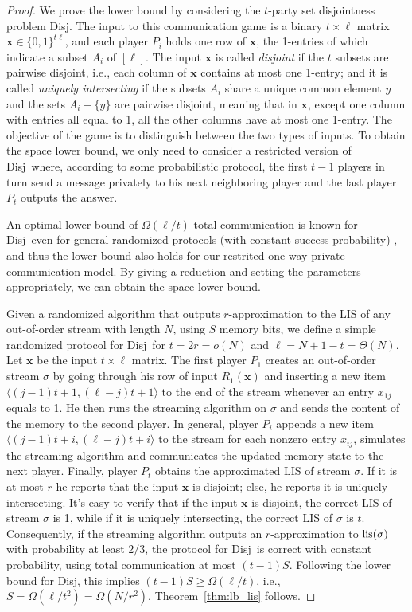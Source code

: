 \documentclass{llncs}
\newcommand{\disj}{{\sc Disj}}
\newcommand{\bx}{\mathbf{x}}
\newcommand{\lis}{{\rm lis}}
\begin{document}
\begin{proof}
We prove the lower bound by considering the $t$-party set disjointness
problem \disj.  The input to this communication game is a binary $t \times \ell$
matrix $\bx \in \{0, 1\}^{t\ell}$, and each player $P_i$ holds one row of
$\bx$, the 1-entries of which indicate a subset $A_i$ of $[\ell]$.  The input
$\bx$ is called \emph{disjoint} if the $t$ subsets are pairwise
disjoint, i.e., each column of $\bx$ contains at most one 1-entry; and it is
called \emph{uniquely intersecting} if the subsets $A_i$ share a unique common
element $y$ and the sets $A_i - \{y\}$ are pairwise disjoint, meaning that in
$\bx$, except one column with entries all equal to 1, all the other columns have at most one
1-entry.  The objective of the game is to distinguish between the two types of
inputs.  To obtain the space lower bound, we only need to consider a restricted 
version of \disj~where, according to some probabilistic protocol, the first
$t-1$ players in turn send a message privately to his next neighboring player and the last
player $P_t$ outputs the answer.

An optimal lower bound of $\Omega(\ell/t)$ total communication is known for
\disj~even for general randomized protocols (with constant success probability) 
\cite{Jay09}, and thus the lower
bound also holds for our restrited one-way private communication model.  By
giving a reduction and setting the parameters appropriately, we can obtain the
space lower bound.

Given a randomized algorithm that outputs $r$-approximation to the LIS of any out-of-order stream
with length $N$, using $S$ memory bits, we
define a simple randomized protocol for \disj~for $t = 2r = o(N)$ and $\ell =
N+1-t = \Theta(N)$.  Let $\bx$ be the input $t\times \ell$ matrix.  The first player
$P_1$ creates an out-of-order stream $\sigma$ by going through his row of input
$R_1(\bx)$ and inserting a new item $\langle (j-1)t+1, (\ell-j)t+1 \rangle$ to
the end of the stream
whenever an entry $x_{1j}$ equals to 1.  He then runs the streaming algorithm on
$\sigma$ and sends the content of the memory to the second player.  In general,
player $P_i$ appends a new item $\langle (j-1)t+i, (\ell-j)t+i \rangle$ to the
stream for each nonzero entry $x_{ij}$, simulates the streaming algorithm and
communicates the updated memory state to the next player.  Finally, player $P_t$ obtains
the approximated LIS of stream $\sigma$.  If it is at most $r$ he reports
that the input $\bx$ is disjoint; else, he reports it is uniquely intersecting.
It's easy to verify that if the input $\bx$ is disjoint, the correct LIS of stream $\sigma$ is 1,
while if it is uniquely intersecting, the correct LIS of $\sigma$ is $t$.
Consequently, if the streaming algorithm outputs an $r$-approximation to
$\lis(\sigma)$ with probability at least $2/3$, the protocol for \disj~is
correct with constant probability, using total communication at most $(t-1)S$.
Following the lower bound for \disj, this implies $(t-1)S \ge \Omega(\ell/t)$,
i.e., $S = \Omega(\ell/t^2) = \Omega(N/r^2)$.  Theorem~\ref{thm:lb_lis} follows.
\end{proof}
\end{document}
